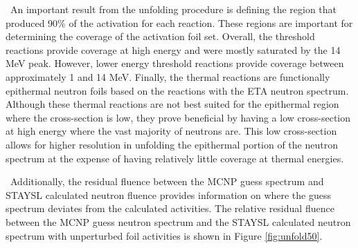 \ An important result from the unfolding procedure is defining the region that produced 90\% of the activation for each reaction. 
These regions are important for determining the coverage of the activation foil set. 
Overall, the threshold reactions provide coverage at high energy and were mostly saturated by the 14 MeV peak. 
However, lower energy threshold reactions provide coverage between approximately 1 and 14 MeV. 
Finally, the thermal reactions are functionally epithermal neutron foils based on the reactions with the ETA neutron spectrum. 
Although these thermal reactions are not best suited for the epithermal region where the cross-section is low, they prove beneficial by having a low cross-section at high energy where the vast majority of neutrons are. 
This low cross-section allows for higher resolution in unfolding the epithermal portion of the neutron spectrum at the expense of having relatively little coverage at thermal energies. 

\ Additionally, the residual fluence between the MCNP guess spectrum and STAYSL calculated neutron fluence provides information on where the guess spectrum deviates from the calculated activities. The relative residual fluence between the MCNP guess neutron spectrum and the STAYSL calculated neutron spectrum with unperturbed foil activities is shown in Figure \ref{fig:unfold50}. 

